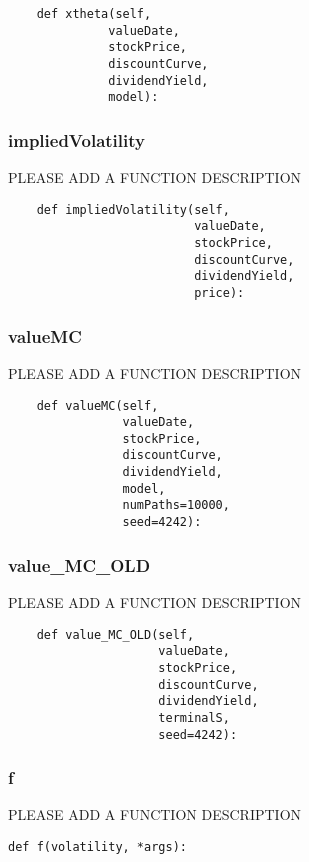 \documentclass[twoside,11pt]{book}
\begin{document}
\begin{lstlisting}
    def xtheta(self,
              valueDate,
              stockPrice,
              discountCurve,
              dividendYield,
              model):
\end{lstlisting}

\subsubsection*{{\bf impliedVolatility}}
PLEASE ADD A FUNCTION DESCRIPTION

\begin{lstlisting}
    def impliedVolatility(self,
                          valueDate,
                          stockPrice,
                          discountCurve,
                          dividendYield,
                          price):
\end{lstlisting}

\subsubsection*{{\bf valueMC}}
PLEASE ADD A FUNCTION DESCRIPTION

\begin{lstlisting}
    def valueMC(self,
                valueDate,
                stockPrice,
                discountCurve,
                dividendYield,
                model,
                numPaths=10000,
                seed=4242):
\end{lstlisting}

\subsubsection*{{\bf value\_MC\_OLD}}
PLEASE ADD A FUNCTION DESCRIPTION

\begin{lstlisting}
    def value_MC_OLD(self,
                     valueDate,
                     stockPrice,
                     discountCurve,
                     dividendYield,
                     terminalS,
                     seed=4242):
\end{lstlisting}

\subsubsection*{{\bf f}}
PLEASE ADD A FUNCTION DESCRIPTION

\begin{lstlisting}
def f(volatility, *args):
\end{lstlisting}
\end{document}

